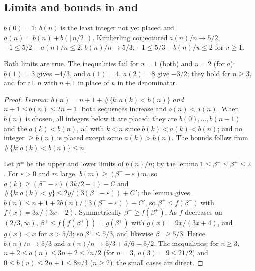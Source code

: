\subsection{Limits and bounds in  and }\label{s:A304451}
$b(0)=1$; $b(n)$ is the least integer not yet placed and $a(n)=b(n)+b(\lfloor n/2\rfloor)$. Kimberling conjectured
$a(n)/n\to5/2$, $-1\le5/2-a(n)/n\le2$, $b(n)/n\to5/3$, $-1\le5/3-b(n)/n\le2$ for $n\ge1$.
\begin{theorem} Both limits are true. The inequalities fail for $n=1$ (both) and $n=2$ (for $a$): $b(1)=3$
gives $-4/3$, and $a(1)=4$, $a(2)=8$ give $-3/2$; they hold for $n\ge3$, and for all $n$ with $n+1$ in place of
$n$ in the denominator.\end{theorem}
\begin{proof} \emph{Lemma: $b(n)=n+1+\#\{k:a(k)<b(n)\}$ and $n+1\le b(n)\le2n+1$.} Both sequences increase and
$b(n)<a(n)$. When $b(n)$ is chosen, all integers below it are placed: they are $b(0),\dots,b(n-1)$ and the
$a(k)<b(n)$, all with $k<n$ since $b(k)<a(k)<b(n)$; and no integer $\ge b(n)$ is placed except some $a(k)>b(n)$.
The bounds follow from $\#\{k:a(k)<b(n)\}\le n$.

Let $\beta^\pm$ be the upper and lower limits of $b(n)/n$; by the lemma $1\le\beta^-\le\beta^+\le2$. For
$\varepsilon>0$ and $m$ large, $b(m)\ge(\beta^--\varepsilon)m$, so $a(k)\ge(\beta^--\varepsilon)(3k/2-1)-C$ and
$\#\{k:a(k)<y\}\le2y/(3(\beta^--\varepsilon))+C'$; the lemma gives $b(n)\le n+1+2b(n)/(3(\beta^--\varepsilon))+C'$, so
$\beta^+\le f(\beta^-)$ with $f(x)=3x/(3x-2)$. Symmetrically $\beta^-\ge f(\beta^+)$. As $f$ decreases on
$(2/3,\infty)$, $\beta^+\le f(f(\beta^+))=g(\beta^+)$ with $g(x)=9x/(3x+4)$, and $g(x)<x$ for $x>5/3$; so
$\beta^+\le5/3$, and likewise $\beta^-\ge5/3$. Hence $b(n)/n\to5/3$ and $a(n)/n\to5/3+5/6=5/2$. The
inequalities: for $n\ge3$, $n+2\le a(n)\le3n+2\le7n/2$ (for $n=3$, $a(3)=9\le21/2$) and $0\le b(n)\le2n+1\le8n/3$
($n\ge2$); the small cases are direct. \end{proof}

